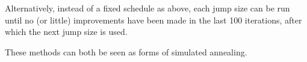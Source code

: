 \documentclass[ejs,preprint]{imsart}
\begin{document}
Alternatively, instead of a fixed schedule as above, each jump size can be run until no (or little) improvements have been made in the last 100 iterations, after which the next jump size is used.

These methods can both be seen as forms of simulated annealing.




















\end{document}
